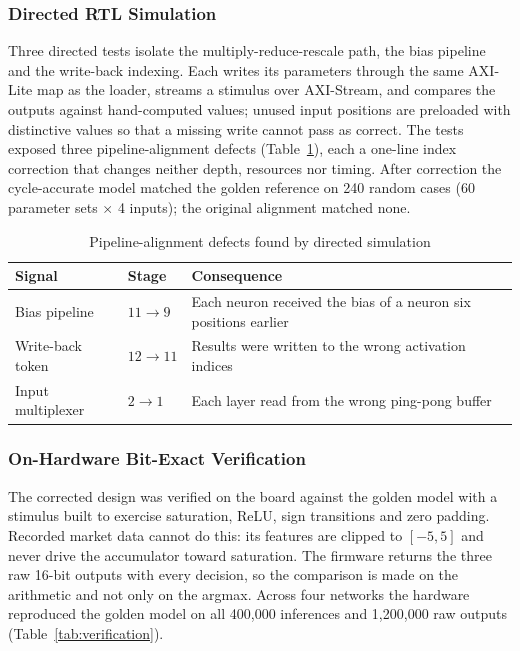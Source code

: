 \documentclass[final,5p,times,twocolumn]{elsarticle}
\begin{document}
\subsubsection{Directed RTL Simulation}
Three directed tests isolate the multiply-reduce-rescale path, the bias pipeline
and the write-back indexing. Each writes its parameters through the same
AXI-Lite map as the loader, streams a stimulus over AXI-Stream, and compares
the outputs against hand-computed values; unused input positions are preloaded
with distinctive values so that a missing write cannot pass as correct. The
tests exposed three pipeline-alignment defects (Table~\ref{tab:rtl_defects}),
each a one-line index correction that changes neither depth, resources nor
timing. After correction the cycle-accurate model matched the golden reference
on 240 random cases (60 parameter sets $\times$ 4 inputs); the original
alignment matched none.

\begin{table}[htbp]
\centering
\caption{Pipeline-alignment defects found by directed simulation}
\label{tab:rtl_defects}
\small
\begin{tabular}{@{}p{2.0cm}p{1.3cm}p{4.1cm}@{}}
\toprule
Signal & Stage & Consequence \\
\midrule
Bias pipeline & $11\!\rightarrow\!9$ & Each neuron received the bias of a neuron six positions earlier \\
Write-back token & $12\!\rightarrow\!11$ & Results were written to the wrong activation indices \\
Input multiplexer & $2\!\rightarrow\!1$ & Each layer read from the wrong ping-pong buffer \\
\bottomrule
\end{tabular}
\end{table}

\subsubsection{On-Hardware Bit-Exact Verification}
The corrected design was verified on the board against the golden model with a
stimulus built to exercise saturation, ReLU, sign transitions and zero padding.
Recorded market data cannot do this: its features are clipped to $[-5,5]$ and
never drive the accumulator toward saturation. The firmware returns the three
raw 16-bit outputs with every decision, so the comparison is made on the
arithmetic and not only on the argmax. Across four networks the hardware
reproduced the golden model on all 400{,}000 inferences and 1{,}200{,}000 raw
outputs (Table~\ref{tab:verification}).
\end{document}
